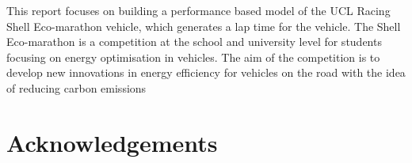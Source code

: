 \documentclass[11pt]{article}
\numberwithin{equation}{section}
\begin{document}
This report focuses on building a performance based model of the UCL Racing Shell Eco-marathon vehicle, which generates a lap time for the vehicle. The Shell Eco-marathon is a competition at the school and university level for students focusing on energy optimisation in vehicles. The aim of the competition is to develop new innovations in energy efficiency for vehicles on the road with the idea of reducing carbon emissions \citep{shell1}
\section*{Acknowledgements}
\tableofcontents
\listoffigures
\listoftables
\newpage


\end{document}
